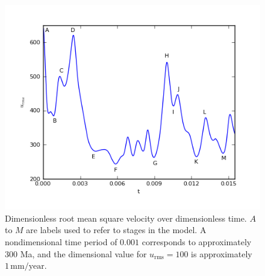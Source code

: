 \begin{figure}
  \center\includegraphics[width=0.95\columnwidth]{chapters/vynnytska/png/u_rms.png}
  \caption{Dimensionless root mean square velocity over
  dimensionless time. $A$ to $M$ are labels used to refer to stages
  in the model. A nondimensional time period of $0.001$ corresponds to
  approximately 300 Ma, and the dimensional value for $u_{\mathrm{rms}} = 100$ is
  approximately $1\,\mathrm{mm/year}$.}
\label{vynnytska:fig:rms_velocity}
\end{figure}

